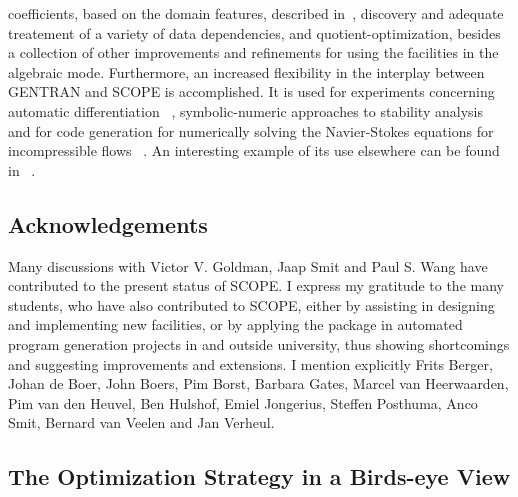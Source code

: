 coefficients, based on the domain features, described in~\cite{Bradford:86},
discovery and adequate treatement of a variety of data dependencies, and
quotient-optimization, besides a collection of other improvements and
refinements for using the facilities in the algebraic mode.
Furthermore, an increased flexibility in the interplay between
GENTRAN and SCOPE is accomplished.  It is used for experiments concerning
automatic differentiation ~\cite{Goldman:91}, symbolic-numeric approaches to
stability analysis ~\cite{Ganzha:92,Ganzha:94} and for code generation for
numerically solving the Navier-Stokes equations for incompressible
flows ~\cite{Goldman:95}. An interesting example of its use elsewhere can be found
in ~\cite{Dyer:94}.

\subsection{Acknowledgements}\label{SCOPE:ackn}

Many discussions with Victor V. Goldman, Jaap Smit and Paul S. Wang
have contributed to the present status of SCOPE. I express my
gratitude to the many students, who have also
contributed to SCOPE, either by assisting in designing and implementing new
facilities, or by applying the package in automated program generation projects
in and outside university, thus showing shortcomings and suggesting
improvements and extensions.  I mention explicitly
Frits Berger, Johan de Boer, John Boers, Pim Borst, Barbara Gates,
Marcel van Heerwaarden, Pim van den Heuvel, Ben Hulshof, Emiel Jongerius,
Steffen Posthuma, Anco Smit, Bernard van Veelen and Jan Verheul.

\subsection{The Optimization Strategy in a Birds-eye View}\label{SCOPE:bird}

